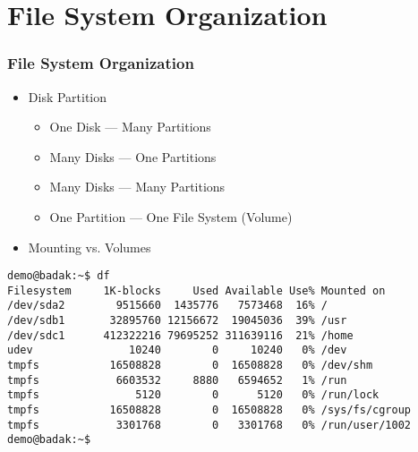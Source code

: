 \documentclass[xcolor=table, notheorems, hyperref={pdfpagelabels=false}]{beamer}
\begin{document}
\section{File System Organization}
\begin{frame}[fragile]
\frametitle{File System Organization}
\begin{itemize}
\item Disk Partition
\begin{itemize}
\item One Disk --- Many Partitions
\item Many Disks --- One Partitions
\item Many Disks --- Many Partitions
\item One Partition --- One File System (Volume)
\end{itemize}
\item Mounting vs. Volumes
\end{itemize}
\begin{lstlisting}[basicstyle=\ttfamily\footnotesize]
demo@badak:~$ df
Filesystem     1K-blocks     Used Available Use% Mounted on
/dev/sda2        9515660  1435776   7573468  16% /
/dev/sdb1       32895760 12156672  19045036  39% /usr
/dev/sdc1      412322216 79695252 311639116  21% /home
udev               10240        0     10240   0% /dev
tmpfs           16508828        0  16508828   0% /dev/shm
tmpfs            6603532     8880   6594652   1% /run
tmpfs               5120        0      5120   0% /run/lock
tmpfs           16508828        0  16508828   0% /sys/fs/cgroup
tmpfs            3301768        0   3301768   0% /run/user/1002
demo@badak:~$ 
\end{lstlisting}
\end{frame}

\end{document}
